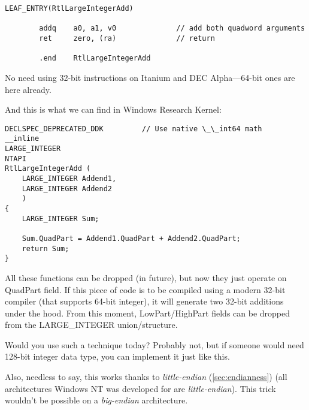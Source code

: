 \begin{lstlisting}[caption=DEC Alpha arch]
        LEAF_ENTRY(RtlLargeIntegerAdd)

        addq    a0, a1, v0              // add both quadword arguments
        ret     zero, (ra)              // return

        .end    RtlLargeIntegerAdd
\end{lstlisting}

No need using 32-bit instructions on Itanium and DEC Alpha---64-bit ones are here already.

And this is what we can find in Windows Research Kernel:

\begin{lstlisting}[style=customc]
DECLSPEC_DEPRECATED_DDK         // Use native \_\_int64 math
__inline
LARGE_INTEGER
NTAPI
RtlLargeIntegerAdd (
    LARGE_INTEGER Addend1,
    LARGE_INTEGER Addend2
    )
{
    LARGE_INTEGER Sum;

    Sum.QuadPart = Addend1.QuadPart + Addend2.QuadPart;
    return Sum;
}
\end{lstlisting}

All these functions can be dropped (in future), but now they just operate on QuadPart field.
If this piece of code is to be compiled using a modern 32-bit compiler (that supports 64-bit integer),
it will generate two 32-bit additions under the hood.
From this moment, LowPart/HighPart fields can be dropped from the LARGE\_INTEGER union/structure.

Would you use such a technique today?
Probably not, but if someone would need 128-bit integer data type, you can implement it just like this.

Also, needless to say, this works thanks to \emph{little-endian} (\ref{sec:endianness})
(all architectures Windows NT was developed for are \emph{little-endian}).
This trick wouldn't be possible on a \emph{big-endian} architecture.

